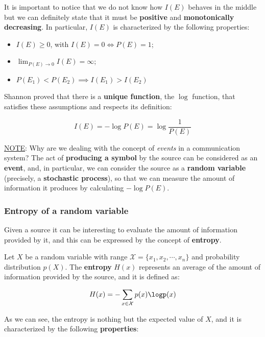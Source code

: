 
It is important to notice that we do not know how $I(E)$ behaves in the middle but we can definitely state that it must be \textbf{positive} and \textbf{monotonically decreasing}. In particular, $I(E)$ is characterized by the following properties:

\begin{itemize}
    \item $I(E) \geq 0$, with $I(E) = 0 \iff P(E) = 1$;
    \item $\lim_{P(E) \to 0} I(E) = \infty$;
    \item $P(E_1) < P(E_2) \implies I(E_1) > I(E_2)$
\end{itemize}

Shannon proved that there is a \textbf{unique function}, the $\log$ function, that satisfies these assumptions and respects its definition:

$$I(E) = -\log P(E) = \log \frac{1}{P(E)} $$


\underline{NOTE}: Why are we dealing with the concept of \textit{events} in a communication system? The act of \textbf{producing a symbol} by the source can be considered as an \textbf{event}, and, in particular, we can consider the source as a \textbf{random variable} (precisely, a \textbf{stochastic process}), so that we can measure the amount of information it produces by calculating $-\log P(E)$.

\subsubsection{Entropy of a random variable}
Given a source it can be interesting to evaluate the amount of information provided by it, and this can be expressed by the concept of \textbf{entropy}.

Let $X$ be a random variable with range $\mathcal{X} = \{x_1, x_2, \cdots, x_n\}$ and probability distribution $p(X)$. The \textbf{entropy} $H(x)$ represents an average of the amount of information provided by the source, and it is defined as:

$$
H(x) =  - \sum_{x \in \mathcal{X}} p(x) \logp(x)
$$

As we can see, the entropy is nothing but the expected value of $X$, and it is characterized by the following \textbf{properties}:

